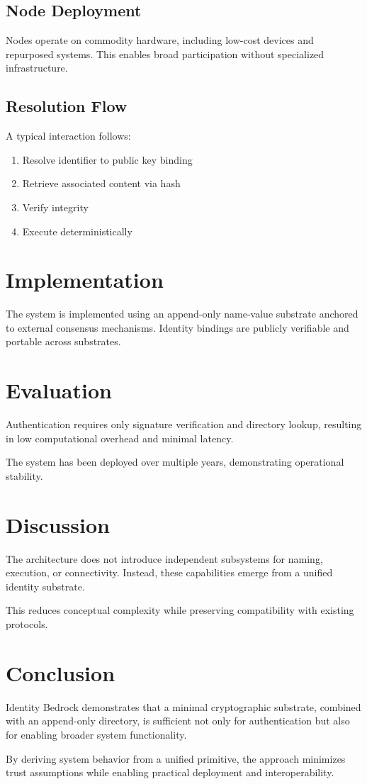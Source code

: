 \documentclass[11pt,a4paper]{article}
\begin{document}
\subsection{Node Deployment}

Nodes operate on commodity hardware, including low-cost devices and repurposed systems. This enables broad participation without specialized infrastructure.

\subsection{Resolution Flow}

A typical interaction follows:

\begin{enumerate}
\item Resolve identifier to public key binding
\item Retrieve associated content via hash
\item Verify integrity
\item Execute deterministically
\end{enumerate}

\section{Implementation}

The system is implemented using an append-only name-value substrate anchored to external consensus mechanisms. Identity bindings are publicly verifiable and portable across substrates.

\section{Evaluation}

Authentication requires only signature verification and directory lookup, resulting in low computational overhead and minimal latency.

The system has been deployed over multiple years, demonstrating operational stability.

\section{Discussion}

The architecture does not introduce independent subsystems for naming, execution, or connectivity. Instead, these capabilities emerge from a unified identity substrate.

This reduces conceptual complexity while preserving compatibility with existing protocols.

\section{Conclusion}

Identity Bedrock demonstrates that a minimal cryptographic substrate, combined with an append-only directory, is sufficient not only for authentication but also for enabling broader system functionality.

By deriving system behavior from a unified primitive, the approach minimizes trust assumptions while enabling practical deployment and interoperability.
\end{document}
